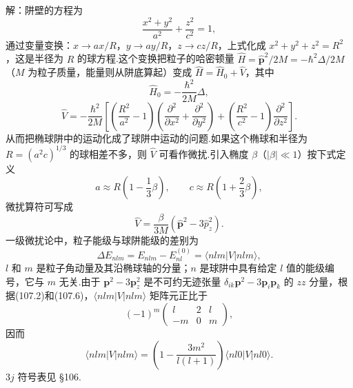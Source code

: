 \begin{xiti}
解：阱壁的方程为
\begin{equation*}
  \frac{x^2+y^2}{a^2}+\frac{z^2}{c^2}=1,
\end{equation*}
通过变量变换：$x\longrightarrow ax/R$，$y\longrightarrow ay/R$，$z\longrightarrow cz/R$，上式化成 $x^2+y^2+z^2=R^2$，这是半径为 $R$ 的球方程.这个变换把粒子的哈密顿量 $\hat{H}=\hat{\boldsymbol{p}}^2/2M=-\hbar^2\Delta/2M$（$M$ 为粒子质量，能量则从阱底算起）变成 $\hat{H}=\hat{H}_0+\hat{V}$，其中
\begin{equation*}
  \hat{H}_0=-\frac{\hbar^2}{2M}\Delta,
\end{equation*}
\begin{equation*}
  \hat{V}=-\frac{\hbar^2}{2M}\left[\left(\frac{R^2}{a^2}-1\right)
  \left(\frac{\partial^2}{\partial x^2}+\frac{\partial^2}{\partial y^2}\right)
  +\left(\frac{R^2}{c^2}-1\right)\frac{\partial^2}{\partial z^2}\right].
\end{equation*}
从而把椭球阱中的运动化成了球阱中运动的问题.如果这个椭球和半径为 $R=\left(a^2c\right)^{1/3}$ 的球相差不多，则 $\hat{V}$ 可看作微扰.引入椭度 $\beta$（$|\beta|\ll1$）按下式定义
\begin{equation*}
  a\approx R\left(1-\frac{1}{3}\beta\right),\qquad c\approx R\left(1+\frac{2}{3}\beta\right),
\end{equation*}
微扰算符可写成
\begin{equation*}
  \hat{V}=\frac{\beta}{3M}\left(\hat{\boldsymbol{p}}^2-3\hat{p}_z^2\right).
\end{equation*}
一级微扰论中，粒子能级与球阱能级的差别为
\begin{equation*}
  \Delta E_{nlm}=E_{nlm}-E_{nl}^{(0)}=\langle nlm|V|nlm\rangle,
\end{equation*}
$l$ 和 $m$ 是粒子角动量及其沿椭球轴的分量；$n$ 是球阱中具有给定 $l$ 值的能级编号，它与 $m$ 无关.由于 $\boldsymbol{p}^2-3\boldsymbol{p}_z^2$ 是不可约无迹张量 $\delta_{ik}\boldsymbol{p}^2-3\boldsymbol{p}_i\boldsymbol{p}_k$ 的 $zz$ 分量，根据(107.2)和(107.6)，$\langle nlm|V|nlm\rangle$ 矩阵元正比于
\begin{equation*}
  (-1)^m\left(\begin{array}{ccc}
    l & 2 & l\\
    -m & 0 & m
  \end{array}\right),
\end{equation*}
因而
\begin{equation*}
  \langle nlm|V|nlm\rangle=\left(1-\frac{3m^2}{l(l+1)}\right)\langle nl0|V|nl0\rangle.
\end{equation*}
$3j$ 符号表见 §106.


\end{xiti}
